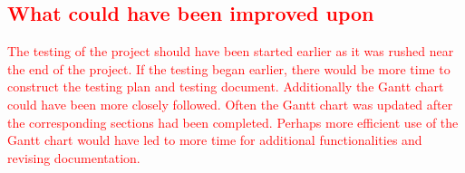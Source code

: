 \documentclass[12pt,fleqn]{article}
\begin{document}
\textcolor{red}{\subsection{What could have been improved upon}
The testing of the project should have been started earlier as it was rushed near the end of the project.  If the testing began earlier, there would be more time to construct the testing plan and testing document.  Additionally the Gantt chart could have been more closely followed.  Often the Gantt chart was updated after the corresponding sections had been completed.  Perhaps more efficient use of the Gantt chart would have led to more time for additional functionalities and revising documentation. }
\end{document}

